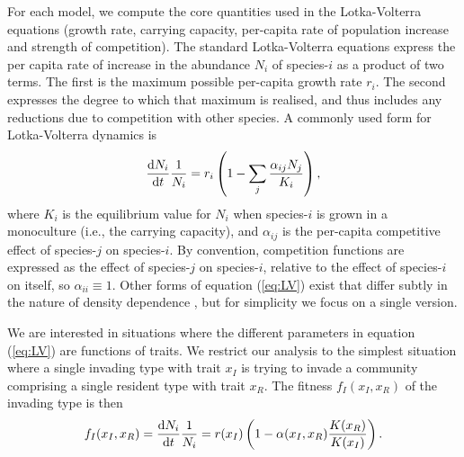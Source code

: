 \documentclass[a4paper,11pt]{article}
\begin{document}
For each model, we compute the core quantities used in the
Lotka-Volterra equations (growth rate, carrying capacity, per-capita
rate of population increase and strength of competition).  The
standard Lotka-Volterra equations express the per capita rate of
increase in the abundance $N_i$ of species-$i$ as a product of two
terms.
%
The first is the maximum possible per-capita growth rate $r_i$. The
second expresses the degree to which that maximum is realised, and
thus includes any reductions due to competition with other species. A
commonly used form for Lotka-Volterra dynamics is
%
\begin{equation}
\label{eq:LV}
\frac{\mathrm{d} N_i}{\mathrm{d} t} \frac{1}{N_i} =
r_i \left(1 - \sum_j \frac{\alpha_{ij} N_j}{K_i}\right),
\end{equation}
%
where $K_i$ is the equilibrium value for $N_i$ when species-$i$ is
grown in a monoculture (i.e., the carrying capacity), and
$\alpha_{ij}$ is the per-capita competitive effect of species-$j$ on
species-$i$.  By convention, competition functions are expressed as
the effect of species-$j$ on species-$i$, relative to the effect of
species-$i$ on itself, so $\alpha_{ii}\equiv 1$.
%
Other forms of equation (\ref{eq:LV}) exist that differ subtly in the
nature of density dependence \citep[e.g.][]{Leimar-2013}, but for
simplicity we focus on a single version.

We are interested in situations where the different parameters in
equation (\ref{eq:LV}) are functions of traits.  We restrict our
analysis to the simplest situation where a single invading type with
trait $x_I$ is trying to invade a community comprising a single
resident type with trait $x_R$.  The fitness $f_I(x_I, x_R)$ of the
invading type is then
%
\begin{equation}
  \label{eq:LVi}
   f_I(x_I, x_R) = \frac{\mathrm{d} N_i}{\mathrm{d} t} \frac{1}{N_i} =
    r(x_I)\left(1 - \alpha(x_I, x_R) \frac{K(x_R)}{K(x_I)}\right).
\end{equation}
%
\end{document}
